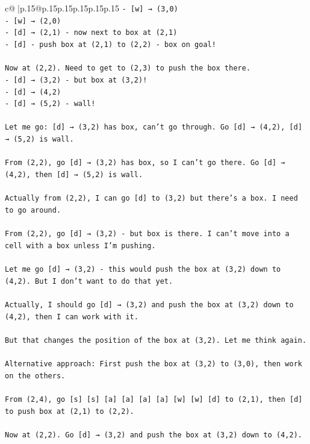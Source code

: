 \documentclass{article}
\begin{document}
{\begin{supertabular}{c@{$\;$}|p{.15\linewidth}@{}p{.15\linewidth}p{.15\linewidth}p{.15\linewidth}p{.15\linewidth}p{.15\linewidth}}
{{{\texttt{{-} {[}w{]} → (3,0)} \\
\texttt{{-} {[}w{]} → (2,0)} \\
\texttt{{-} {[}d{]} → (2,1) {-} now next to box at (2,1)} \\
\texttt{{-} {[}d{]} {-} push box at (2,1) to (2,2) {-} box on goal!} \\
\\ 
\texttt{Now at (2,2). Need to get to (2,3) to push the box there.} \\
\texttt{{-} {[}d{]} → (3,2) {-} but box at (3,2)!} \\
\texttt{{-} {[}d{]} → (4,2)} \\
\texttt{{-} {[}d{]} → (5,2) {-} wall!} \\
\\ 
\texttt{Let me go: {[}d{]} → (3,2) has box, can't go through. Go {[}d{]} → (4,2), {[}d{]} → (5,2) is wall.} \\
\\ 
\texttt{From (2,2), go {[}d{]} → (3,2) has box, so I can't go there. Go {[}d{]} → (4,2), then {[}d{]} → (5,2) is wall.} \\
\\ 
\texttt{Actually from (2,2), I can go {[}d{]} to (3,2) but there's a box. I need to go around.} \\
\\ 
\texttt{From (2,2), go {[}d{]} → (3,2) {-} but box is there. I can't move into a cell with a box unless I'm pushing.} \\
\\ 
\texttt{Let me go {[}d{]} → (3,2) {-} this would push the box at (3,2) down to (4,2). But I don't want to do that yet.} \\
\\ 
\texttt{Actually, I should go {[}d{]} → (3,2) and push the box at (3,2) down to (4,2), then I can work with it.} \\
\\ 
\texttt{But that changes the position of the box at (3,2). Let me think again.} \\
\\ 
\texttt{Alternative approach: First push the box at (3,2) to (3,0), then work on the others.} \\
\\ 
\texttt{From (2,4), go {[}s{]} {[}s{]} {[}a{]} {[}a{]} {[}a{]} {[}a{]} {[}w{]} {[}w{]} {[}d{]} to (2,1), then {[}d{]} to push box at (2,1) to (2,2).} \\
\\ 
\texttt{Now at (2,2). Go {[}d{]} → (3,2) and push the box at (3,2) down to (4,2).} \\
}}}
\end{supertabular}}
\end{document}
